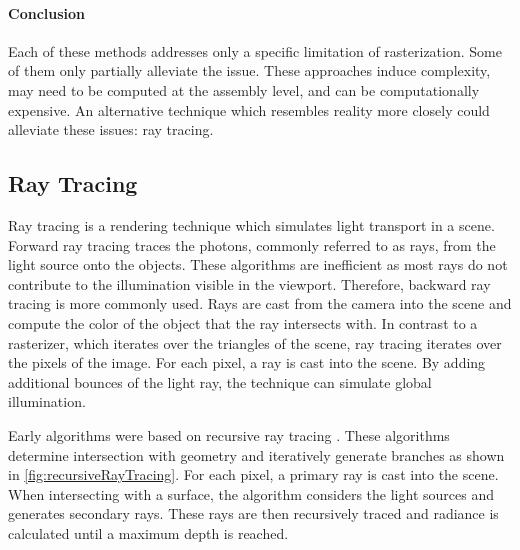 \paragraph{Conclusion}

Each of these methods addresses only a specific limitation of rasterization. Some of them only partially alleviate the issue. These approaches induce complexity, may need to be computed at the assembly level, and can be computationally expensive. An alternative technique which resembles reality more closely could alleviate these issues: ray tracing.

\subsection{Ray Tracing}
\label{ch:rayTracingTheory}

Ray tracing is a rendering technique which simulates light transport in a scene. Forward ray tracing traces the photons, commonly referred to as rays, from the light source onto the objects. These algorithms are inefficient as most rays do not contribute to the illumination visible in the viewport. Therefore, backward ray tracing is more commonly used. Rays are cast from the camera into the scene and compute the color of the object that the ray intersects with. In contrast to a rasterizer, which iterates over the triangles of the scene, ray tracing iterates over the pixels of the image. For each pixel, a ray is cast into the scene. By adding additional bounces of the light ray, the technique can simulate global illumination.

Early algorithms were based on recursive ray tracing \cite{whittedGlobalIllumination}. These algorithms determine intersection with geometry and iteratively generate branches as shown in \autoref{fig:recursiveRayTracing}. For each pixel, a primary ray is cast into the scene. When intersecting with a surface, the algorithm considers the light sources and generates secondary rays. These rays are then recursively traced and radiance is calculated until a maximum depth is reached.

